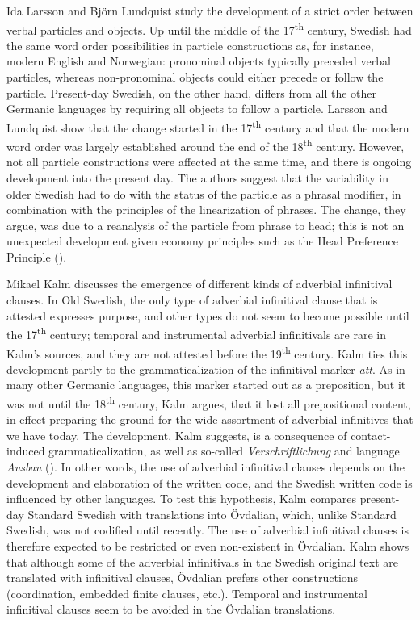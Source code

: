 \documentclass[output=paper]{langscibook}
\begin{document}
Ida Larsson and Björn Lundquist study the development of a strict order between verbal particles and objects. Up until the middle of the 17\textsuperscript{th} century, Swedish had the same word order possibilities in particle constructions as, for instance, modern English and Norwegian: pronominal objects typically preceded verbal particles, whereas non-pronominal objects could either precede or follow the particle. Present-day Swedish, on the other hand, differs from all the other Germanic languages by requiring all objects to follow a particle. Larsson and Lundquist show that the change started in the 17\textsuperscript{th} century and that the modern word order was largely established around the end of the 18\textsuperscript{th} century. However, not all particle constructions were affected at the same time, and there is ongoing development into the present day. The authors suggest that the variability in older Swedish had to do with the status of the particle as a phrasal modifier, in combination with the principles of the linearization of phrases. The change, they argue, was due to a reanalysis of the particle from phrase to head; this is not an unexpected development given economy principles such as the Head Preference Principle (\citealt{van_Gelderen2004}).



Mikael Kalm discusses the emergence of different kinds of adverbial infinitival clauses. In Old Swedish, the only type of adverbial infinitival clause that is attested expresses purpose, and other types do not seem to become possible until the 17\textsuperscript{th} century; temporal and instrumental adverbial infinitivals are rare in Kalm’s sources, and they are not attested before the 19\textsuperscript{th} century. Kalm ties this development partly to the grammaticalization of the infinitival marker \textit{att}. As in many other Germanic languages, this marker started out as a preposition, but it was not until the 18\textsuperscript{th} century, Kalm argues, that it lost all prepositional content, in effect preparing the ground for the wide assortment of adverbial infinitives that we have today. The development, Kalm suggests, is a consequence of contact-induced grammaticalization, as well as so-called \textit{Verschriftlichung} and language \textit{Ausbau} (\citealt{Hoder2009, Hoder2010}). In other words, the use of adverbial infinitival clauses depends on the development and elaboration of the written code, and the Swedish written code is influenced by other languages. To test this hypothesis, Kalm compares present-day Standard Swedish with translations into Övdalian, which, unlike Standard Swedish, was not codified until recently. The use of adverbial infinitival clauses is therefore expected to be restricted or even non-existent in Övdalian. Kalm shows that although some of the adverbial infinitivals in the Swedish original text are translated with infinitival clauses, Övdalian prefers other constructions (coordination, embedded finite clauses, etc.). Temporal and instrumental infinitival clauses seem to be avoided in the Övdalian translations.
\end{document}
